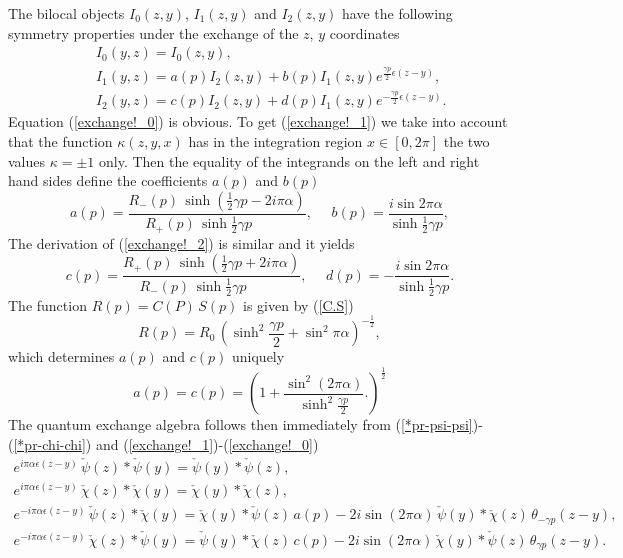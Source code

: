 \documentclass[a4paper,12pt]{article}
\begin{document}
\noindent
The bilocal objects $I_0(z,y)$, $I_1(z,y)$ and $I_2(z,y)$ have the following
symmetry properties under the exchange of the $z$, $y$ coordinates
\begin{eqnarray}\label{exchange!_0}
&&I_0(y,z)=I_0(z,y),\\
\label{exchange!_1}
&&I_1(y,z)= a(p)I_2(z,y)+b(p)I_1(z,y)e^{\frac{\gamma p}{2}\epsilon(z-y)},\\
\label{exchange!_2}
&&I_2(y,z)= c(p)I_2(z,y)+d(p)I_1(z,y)e^{-\frac{\gamma p}{2}\epsilon(z-y)}.
\end{eqnarray}
Equation (\ref{exchange!_0}) is obvious.
To get (\ref{exchange!_1}) we take into account that the function
$\kappa (z,y,x)$ has in the integration region $x\in[0,2\pi]$
the two values $\kappa =\pm 1$ only.  Then the
equality of the integrands on the left and right hand sides define
the coefficients $a(p)$ and $b(p)$
\begin{equation}\label{a(p)}
a(p)=\frac{R_-(p)\,\sinh\left(\frac{1}{2}\gamma p
-2i\pi\alpha\right)}
{R_+ (p)\,\sinh\frac{1}{2}\gamma p~~~~~~~~~~~~},
~~~~~~b(p)=\frac{i\sin 2\pi\alpha}{\sinh\frac{1}{2}\gamma p},
\end{equation}
 The derivation of
(\ref{exchange!_2}) is similar and it yields
\begin{equation}\label{c(p)}
c(p)=\frac{R_+(p)\,\sinh\left(\frac{1}{2}\gamma p
+2i\pi\alpha\right)}
{R_- (p)\,\sinh\frac{1}{2}\gamma p~~~~~~~~~~~~},
~~~~~~d(p)=-\frac{i\sin 2\pi\alpha}{\sinh\frac{1}{2}\gamma p}.
\end{equation}
The function $R(p)=C(P)\,S(p)$ is given by (\ref{C.S})
\begin{equation}\label{R(p)}
R(p)=R_0\,\left(\sinh^2\frac{\gamma p}{2}+
\sin^2\pi\alpha\right)^{-\frac{1}{2}},
\end{equation}
which determines  $a(p)$ and $c(p)$ uniquely
\begin{equation}\label{a,c(p)}
a(p)=c(p)=\left(1+\frac{\sin^2(2\pi\alpha)}{\sinh^2\frac{\gamma p}{2}}.
\right)^{\frac{1}{2}}
\end{equation}
The quantum exchange algebra \cite{Neveu, OW} follows then immediately
from (\ref{*pr-psi-psi})-(\ref{*pr-chi-chi}) and
(\ref{exchange!_1})-(\ref{exchange!_0})
\begin{eqnarray}\label{*pr1-psi-psi}
e^{i\pi\alpha\epsilon(z-y)}\,\check\psi(z)*\check\psi(y)=
\check\psi (y)*\check\psi(z),
~~~~~~~~~~~~~~~~~~~~~~~~~~~~~~~~~~~~~~~~~~~~~~~~~~~~~~\\
\label{*pr1-chi-chi}
e^{i\pi\alpha\epsilon(z-y)}\,\check\chi(z)*\check\chi(y)=
\check\chi (y)*\check\chi(z),
~~~~~~~~~~~~~~~~~~~~~~~~~~~~~~~~~~~~~~~~~~~~~~~~~~~~~~\\
\label{*pr1-psi-chi}
e^{-i\pi\alpha\epsilon(z-y)}\,\check\psi(z)*\check\chi(y)=
\check\chi(y)*\check\psi(z)\,a(p)
-2i\sin (2\pi\alpha)\,
\check\psi(y)*\check\chi(z)
\,\theta_{-\gamma p}(z-y),\\
\label{*pr1-chi-psi}
e^{-i\pi\alpha\epsilon(z-y)}\,\check\chi(z)*\check\psi(y)=
\check\psi(y)*\check\chi(z)\, c(p)
-2i\sin (2\pi\alpha)\,
\check\chi(y)*\check\psi(z)\,\theta_{\gamma p}(z-y).~~~
\end{eqnarray}
\end{document}
